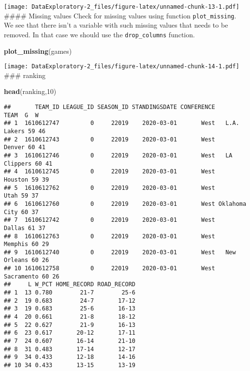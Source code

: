 \documentclass[
]{article}
\newenvironment{Shaded}{\begin{snugshade}}{\end{snugshade}}
\newcommand{\DecValTok}[1]{\textcolor[rgb]{0.00,0.00,0.81}{#1}}
\newcommand{\KeywordTok}[1]{\textcolor[rgb]{0.13,0.29,0.53}{\textbf{#1}}}
\newcommand{\NormalTok}[1]{#1}
\begin{document}
\texttt{[image: DataExploratory-2\_files/figure-latex/unnamed-chunk-13-1.pdf]}
\#\#\#\# Missing values Check for missing values using function
\texttt{plot\_missing}. We see that there isn't a variable with such
missing values that needs to be removed. In that case we should use the
\texttt{drop\_columns} function.

\begin{Shaded}
\begin{Highlighting}[]
\KeywordTok{plot\_missing}\NormalTok{(games)}
\end{Highlighting}
\end{Shaded}

\texttt{[image: DataExploratory-2\_files/figure-latex/unnamed-chunk-14-1.pdf]}
\#\#\# ranking

\begin{Shaded}
\begin{Highlighting}[]
\KeywordTok{head}\NormalTok{(ranking,}\DecValTok{10}\NormalTok{)}
\end{Highlighting}
\end{Shaded}

\begin{verbatim}
##       TEAM_ID LEAGUE_ID SEASON_ID STANDINGSDATE CONFERENCE          TEAM  G  W
## 1  1610612747         0     22019    2020-03-01       West   L.A. Lakers 59 46
## 2  1610612743         0     22019    2020-03-01       West        Denver 60 41
## 3  1610612746         0     22019    2020-03-01       West   LA Clippers 60 41
## 4  1610612745         0     22019    2020-03-01       West       Houston 59 39
## 5  1610612762         0     22019    2020-03-01       West          Utah 59 37
## 6  1610612760         0     22019    2020-03-01       West Oklahoma City 60 37
## 7  1610612742         0     22019    2020-03-01       West        Dallas 61 37
## 8  1610612763         0     22019    2020-03-01       West       Memphis 60 29
## 9  1610612740         0     22019    2020-03-01       West   New Orleans 60 26
## 10 1610612758         0     22019    2020-03-01       West    Sacramento 60 26
##     L W_PCT HOME_RECORD ROAD_RECORD
## 1  13 0.780        21-7        25-6
## 2  19 0.683        24-7       17-12
## 3  19 0.683        25-6       16-13
## 4  20 0.661        21-8       18-12
## 5  22 0.627        21-9       16-13
## 6  23 0.617       20-12       17-11
## 7  24 0.607       16-14       21-10
## 8  31 0.483       17-14       12-17
## 9  34 0.433       12-18       14-16
## 10 34 0.433       13-15       13-19
\end{verbatim}
\end{document}
